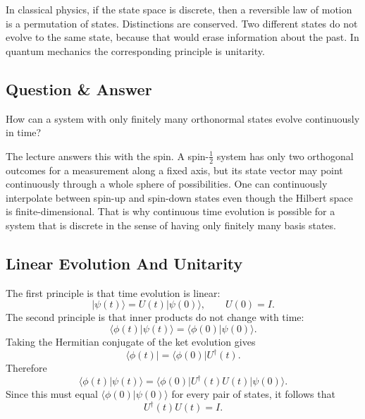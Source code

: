 In classical physics, if the state space is discrete, then a reversible law of motion is a permutation of states. Distinctions are conserved. Two different states do not evolve to the same state, because that would erase information about the past. In quantum mechanics the corresponding principle is unitarity.

\subsection{Question \& Answer}

How can a system with only finitely many orthonormal states evolve continuously in time?

The lecture answers this with the spin. A spin-\(\tfrac12\) system has only two orthogonal outcomes for a measurement along a fixed axis, but its state vector may point continuously through a whole sphere of possibilities. One can continuously interpolate between spin-up and spin-down states even though the Hilbert space is finite-dimensional. That is why continuous time evolution is possible for a system that is discrete in the sense of having only finitely many basis states.

\subsection{Linear Evolution And Unitarity}

The first principle is that time evolution is linear:
\begin{equation}
|\psi(t)\rangle = U(t)|\psi(0)\rangle,
\qquad
U(0)=I.
\end{equation}
The second principle is that inner products do not change with time:
\begin{equation}
\langle \phi(t)|\psi(t)\rangle = \langle \phi(0)|\psi(0)\rangle.
\end{equation}
Taking the Hermitian conjugate of the ket evolution gives
\begin{equation}
\langle \phi(t)| = \langle \phi(0)|U^\dagger(t).
\end{equation}
Therefore
\begin{equation}
\langle \phi(t)|\psi(t)\rangle
=
\langle \phi(0)|U^\dagger(t)U(t)|\psi(0)\rangle.
\end{equation}
Since this must equal \(\langle \phi(0)|\psi(0)\rangle\) for every pair of states, it follows that
\begin{equation}
U^\dagger(t)U(t)=I.
\end{equation}

